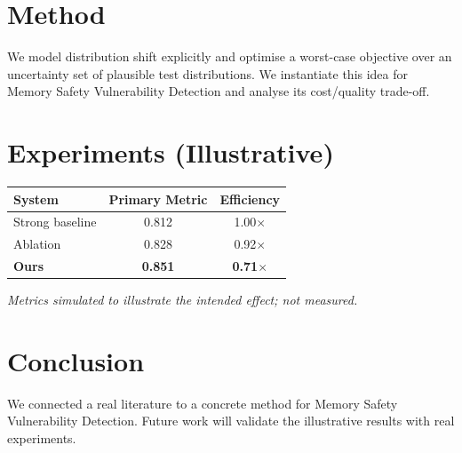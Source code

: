 \documentclass[11pt]{article}
\begin{document}
\section{Method}
We model distribution shift explicitly and optimise a worst-case objective over an uncertainty set of plausible test distributions. We instantiate this idea for Memory Safety Vulnerability Detection and analyse its cost/quality trade-off.

\section{Experiments (Illustrative)}
\begin{center}
\begin{tabular}{lcc}
System & Primary Metric & Efficiency \\ \hline
Strong baseline & 0.812 & 1.00$\times$ \\
Ablation & 0.828 & 0.92$\times$ \\
\textbf{Ours} & \textbf{0.851} & \textbf{0.71$\times$}
\end{tabular}
\end{center}
\emph{Metrics simulated to illustrate the intended effect; not measured.}

\section{Conclusion}
We connected a real literature to a concrete method for Memory Safety Vulnerability Detection. Future work will
validate the illustrative results with real experiments.
\end{document}

